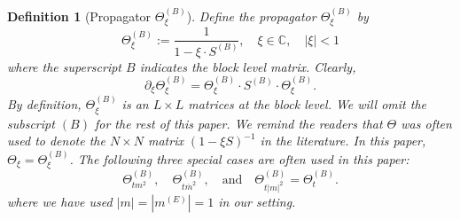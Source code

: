 \documentclass[10pt,reqno]{article}
\renewcommand{\bar}{\overline}
\theoremstyle{plain} %
\newtheorem{definition}[theorem]{Definition}
\theoremstyle{remark}
\numberwithin{equation}{section}
\begin{document}
 \begin{definition}[Propagator $\Theta_\xi^{(B)}$]\label{def_Theta}
Define the propagator  $\Theta_\xi^{(B)}$ by 
\begin{equation}\label{def_Thxi}
    \Theta^{(B)}_\xi := \frac{1}{1 - \xi \cdot S^{(B)}}, \quad \xi \in \mathbb{C}, \quad |\xi| < 1
\end{equation}
where the superscript $B$  indicates the block level matrix. Clearly, 
\begin{equation}\label{deri_Thxi}
    \partial_\xi \Theta^{(B)}_\xi = \Theta^{(B)}_\xi \cdot S^{(B)} \cdot \Theta^{(B)}_\xi.
\end{equation}
By definition, $\Theta_\xi^{(B)}$ is an \(L \times L\) matrices at the block level. We will 
omit the subscript \((B)\) for the rest of this paper. We remind the readers that $\Theta$ 
was often  used to denote the \(N \times N\) matrix 
 \((1 - \xi S)^{-1}\) in the literature.   In this paper,  $\Theta_\xi= \Theta_\xi^{(B)}$.
The following  three special  cases are often used in this paper: 
\[
\Theta^{(B)}_{t m^2}, \quad \Theta^{(B)}_{t \bar{m}^2}, \quad \text{and} \quad \Theta^{(B)}_{t |m|^2} = \Theta^{(B)}_{t}.
\]
where we have used  \(|m| = |m^{(E)}|=1\) in our setting. 


\end{definition}
\end{document}
